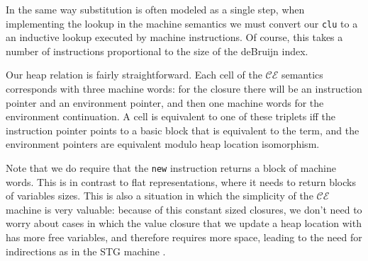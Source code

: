 In the same way substitution is often modeled as a single step, when
implementing the lookup in the machine semantics we must convert our
\texttt{clu} to a an inductive lookup executed by machine instructions. Of
course, this takes a number of instructions proportional to the size of the
deBruijn index. 

Our heap relation is fairly straightforward. Each cell of the $\mathcal{CE}$
semantics corresponds with three machine words: for the closure there will be an
instruction pointer and an environment pointer, and then one machine words for
the environment continuation. A cell is equivalent to one of these triplets iff
the instruction pointer points to a basic block that is equivalent to the term,
and the environment pointers are equivalent modulo heap location isomorphism.

Note that we do require that the \texttt{new} instruction returns a block of
machine words. This is in contrast to flat representations, where it needs to
return blocks of variables sizes. This is also a situation in which the
simplicity of the $\mathcal{CE}$ machine is very valuable: because of this
constant sized closures, we don't need to worry about cases in which the
value closure that we update a heap location with has more free variables, and
therefore requires more space, leading to the need for indirections as in the
STG machine \cite{STG}.



